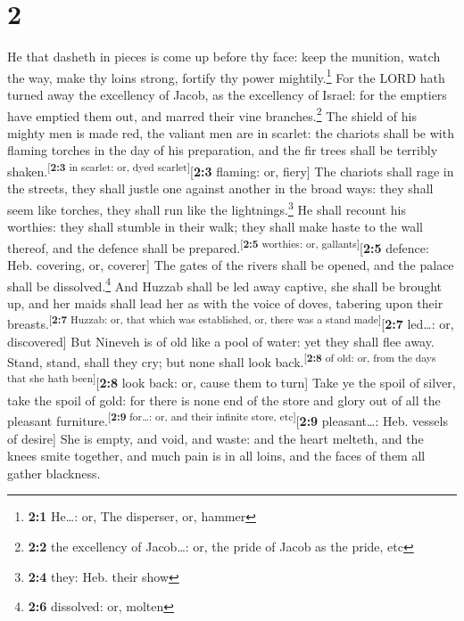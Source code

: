 \hypertarget{section-1}{%
\section{2}\label{section-1}}

 He that dasheth in pieces is come up before thy face:
keep the munition, watch the way, make thy loins strong, fortify thy
power mightily.\footnote{\textbf{2:1} He\ldots: or, The disperser, or,
  hammer}  For the LORD hath turned away the excellency of
Jacob, as the excellency of Israel: for the emptiers have emptied them
out, and marred their vine branches.\footnote{\textbf{2:2} the
  excellency of Jacob\ldots: or, the pride of Jacob as the pride, etc}
 The shield of his mighty men is made red, the valiant men
are in scarlet: the chariots shall be with flaming torches in the day of
his preparation, and the fir trees shall be terribly
shaken.\textsuperscript{{[}\textbf{2:3} in scarlet: or, dyed
scarlet{]}}{[}\textbf{2:3} flaming: or, fiery{]}  The
chariots shall rage in the streets, they shall justle one against
another in the broad ways: they shall seem like torches, they shall run
like the lightnings.\footnote{\textbf{2:4} they: Heb. their show}
 He shall recount his worthies: they shall stumble in
their walk; they shall make haste to the wall thereof, and the defence
shall be prepared.\textsuperscript{{[}\textbf{2:5} worthies: or,
gallants{]}}{[}\textbf{2:5} defence: Heb. covering, or, coverer{]}
 The gates of the rivers shall be opened, and the palace
shall be dissolved.\footnote{\textbf{2:6} dissolved: or, molten}
 And Huzzab shall be led away captive, she shall be
brought up, and her maids shall lead her as with the voice of doves,
tabering upon their breasts.\textsuperscript{{[}\textbf{2:7} Huzzab: or,
that which was established, or, there was a stand
made{]}}{[}\textbf{2:7} led\ldots: or, discovered{]}  But
Nineveh is of old like a pool of water: yet they shall flee away. Stand,
stand, shall they cry; but none shall look
back.\textsuperscript{{[}\textbf{2:8} of old: or, from the days that she
hath been{]}}{[}\textbf{2:8} look back: or, cause them to turn{]}
 Take ye the spoil of silver, take the spoil of gold: for
there is none end of the store and glory out of all the pleasant
furniture.\textsuperscript{{[}\textbf{2:9} for\ldots: or, and their
infinite store, etc{]}}{[}\textbf{2:9} pleasant\ldots: Heb. vessels of
desire{]}  She is empty, and void, and waste: and the
heart melteth, and the knees smite together, and much pain is in all
loins, and the faces of them all gather blackness.


